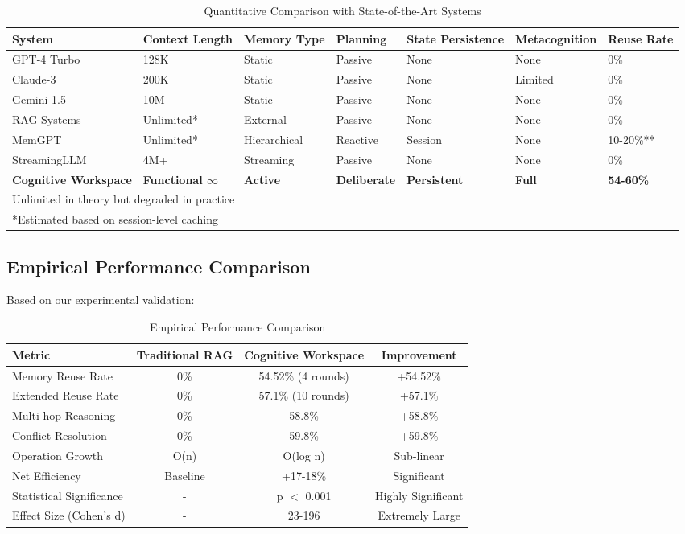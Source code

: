 \documentclass[10pt,twocolumn]{article}
\begin{document}
\begin{table}[t]
\centering
\small
\begin{tabular}{lllllll}
\toprule
System & Context Length & Memory Type & Planning & State Persistence & Metacognition & Reuse Rate \\
\midrule
GPT-4 Turbo & 128K & Static & Passive & None & None & 0\% \\
Claude-3 & 200K & Static & Passive & None & Limited & 0\% \\
Gemini 1.5 & 10M & Static & Passive & None & None & 0\% \\
RAG Systems & Unlimited* & External & Passive & None & None & 0\% \\
MemGPT & Unlimited* & Hierarchical & Reactive & Session & None & 10-20\%** \\
StreamingLLM & 4M+ & Streaming & Passive & None & None & 0\% \\
\textbf{Cognitive Workspace} & \textbf{Functional $\infty$} & \textbf{Active} & \textbf{Deliberate} & \textbf{Persistent} & \textbf{Full} & \textbf{54-60\%} \\
\bottomrule
\multicolumn{7}{l}{\footnotesize *Unlimited in theory but degraded in practice} \\
\multicolumn{7}{l}{\footnotesize **Estimated based on session-level caching} \\
\end{tabular}
\caption{Quantitative Comparison with State-of-the-Art Systems}
\label{tab:quantitative}
\end{table}

\subsection{Empirical Performance Comparison}

Based on our experimental validation:

\begin{table}[t]
\centering
\begin{tabular}{lccc}
\toprule
Metric & Traditional RAG & Cognitive Workspace & Improvement \\
\midrule
Memory Reuse Rate & 0\% & 54.52\% (4 rounds) & +54.52\% \\
Extended Reuse Rate & 0\% & 57.1\% (10 rounds) & +57.1\% \\
Multi-hop Reasoning & 0\% & 58.8\% & +58.8\% \\
Conflict Resolution & 0\% & 59.8\% & +59.8\% \\
Operation Growth & O(n) & O(log n) & Sub-linear \\
Net Efficiency & Baseline & +17-18\% & Significant \\
Statistical Significance & - & p $<$ 0.001 & Highly Significant \\
Effect Size (Cohen's d) & - & 23-196 & Extremely Large \\
\bottomrule
\end{tabular}
\caption{Empirical Performance Comparison}
\label{tab:comparison}
\end{table}
\end{document}
